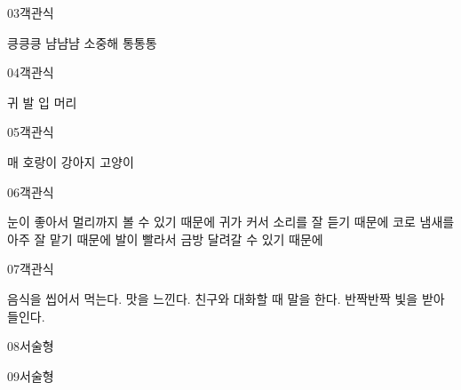 \documentclass[fs13,seriesSau]{korfarm-base}
\begin{document}
\begin{kfQBlock}{03}{객관식}
\begin{kfChoices}
\kfChoice 킁킁킁
\kfChoice 냠냠냠
\kfChoice 소중해
\kfChoice 통통통
\end{kfChoices}
\end{kfQBlock}

\begin{kfQBlock}{04}{객관식}
\begin{kfChoices}
\kfChoice 귀
\kfChoice 발
\kfChoice 입
\kfChoice 머리
\end{kfChoices}
\end{kfQBlock}

\begin{kfQBlock}{05}{객관식}
\begin{kfChoices}
\kfChoice 매
\kfChoice 호랑이
\kfChoice 강아지
\kfChoice 고양이
\end{kfChoices}
\end{kfQBlock}

\begin{kfQBlock}{06}{객관식}
\begin{kfChoices}
\kfChoice 눈이 좋아서 멀리까지 볼 수 있기 때문에
\kfChoice 귀가 커서 소리를 잘 듣기 때문에
\kfChoice 코로 냄새를 아주 잘 맡기 때문에
\kfChoice 발이 빨라서 금방 달려갈 수 있기 때문에
\end{kfChoices}
\end{kfQBlock}

\begin{kfQBlock}{07}{객관식}
\begin{kfChoices}
\kfChoice 음식을 씹어서 먹는다.
\kfChoice 맛을 느낀다.
\kfChoice 친구와 대화할 때 말을 한다.
\kfChoice 반짝반짝 빛을 받아들인다.
\end{kfChoices}
\end{kfQBlock}

\begin{kfQBlock}{08}{서술형}
\end{kfQBlock}

\begin{kfQBlock}{09}{서술형}
\end{kfQBlock}
\end{document}
